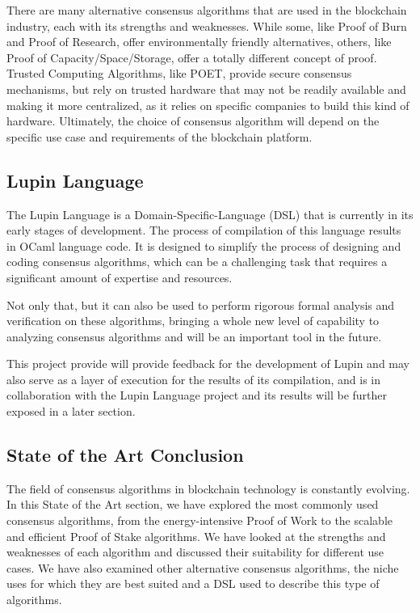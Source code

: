 There are many alternative consensus algorithms that are used in the blockchain industry, each with its strengths and weaknesses.
While some, like Proof of Burn and Proof of Research, offer environmentally friendly alternatives, others, like Proof of Capacity/Space/Sto\-rage, offer a totally different concept of proof.
Trusted Computing Algorithms, like POET, provide secure consensus mechanisms, but rely on trusted hardware that may not be readily available and making it more centralized, as it relies on specific companies to build this kind of hardware.
Ultimately, the choice of consensus algorithm will depend on the specific use case and requirements of the blockchain platform.

\subsection*{\textbf{Lupin Language}}
\label{lupin}

The Lupin Language is a Domain-Specific-Language (DSL) that is currently in its early stages of development. 
The process of compilation of this language results in OCaml language code.
It is designed to simplify the process of designing and coding consensus algorithms, which can be a challenging task that requires a significant amount of expertise and resources.

Not only that, but it can also be used to perform rigorous formal analysis and verification on these algorithms, bringing 
a whole new level of capability to analyzing consensus algorithms and will be an important tool in the future.

This project provide will provide feedback for the development of Lupin and may also serve as a layer of execution for the results of its compilation, and is in collaboration with the Lupin Language project and its results will be further exposed in a later section.


\subsection*{State of the Art Conclusion}
The field of consensus algorithms in blockchain technology is constantly evolving. In this State of the Art section, we have explored the most commonly used consensus algorithms, from the energy-intensive Proof of Work to the scalable and efficient Proof of Stake algorithms. We have looked at the strengths and weaknesses of each algorithm and discussed their suitability for different use cases. We have also examined other alternative consensus algorithms, the niche uses for which they are best suited and a DSL used to describe this type of algorithms.

